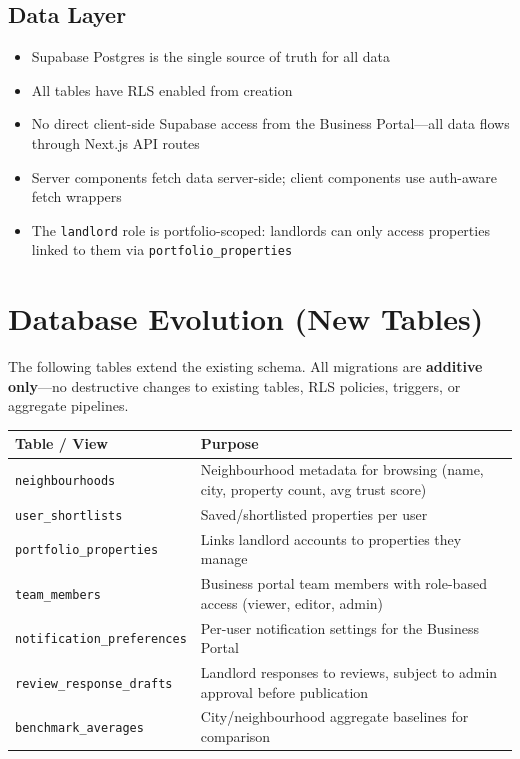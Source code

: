 \documentclass[11pt,letterpaper]{article}
\begin{document}
\subsection{Data Layer}

\begin{itemize}
    \item Supabase Postgres is the single source of truth for all data
    \item All tables have RLS enabled from creation
    \item No direct client-side Supabase access from the Business Portal---all data flows through Next.js API routes
    \item Server components fetch data server-side; client components use auth-aware fetch wrappers
    \item The \texttt{landlord} role is portfolio-scoped: landlords can only access properties linked to them via \texttt{portfolio\_properties}
\end{itemize}

\section{Database Evolution (New Tables)}

The following tables extend the existing schema. All migrations are \textbf{additive only}---no destructive changes to existing tables, RLS policies, triggers, or aggregate pipelines.

\begin{longtable}{p{4.5cm} p{9cm}}
\toprule
\textbf{Table / View} & \textbf{Purpose} \\
\midrule
\endhead
\texttt{neighbourhoods} &
Neighbourhood metadata for browsing (name, city, property count, avg trust score) \\
\addlinespace
\texttt{user\_shortlists} &
Saved/shortlisted properties per user \\
\addlinespace
\texttt{portfolio\_properties} &
Links landlord accounts to properties they manage \\
\addlinespace
\texttt{team\_members} &
Business portal team members with role-based access (viewer, editor, admin) \\
\addlinespace
\texttt{notification\_preferences} &
Per-user notification settings for the Business Portal \\
\addlinespace
\texttt{review\_response\_drafts} &
Landlord responses to reviews, subject to admin approval before publication \\
\addlinespace
\texttt{benchmark\_averages} &
City/neighbourhood aggregate baselines for comparison \\
\bottomrule
\end{longtable}
\end{document}
